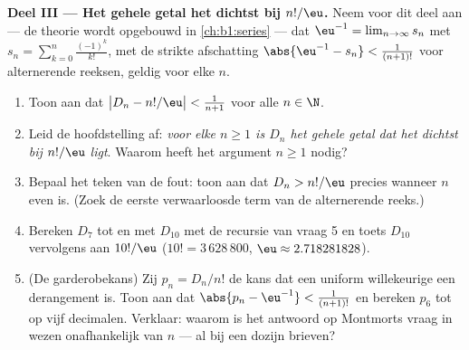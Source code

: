 \begin{problem}
\medskip
\noindent\textbf{Deel III --- Het gehele getal het dichtst bij
$n!/\eu$.} Neem voor dit deel aan --- de theorie wordt opgebouwd in
\cref{ch:b1:series} --- dat $\eu^{-1} = \lim_{n \to \infty} s_n$ met
$s_n = \sum_{k=0}^{n} \frac{(-1)^k}{k!}$, met de strikte afschatting
$\abs{\eu^{-1} - s_n} < \frac1{(n+1)!}$ voor alternerende reeksen, geldig
voor elke $n$.
\begin{enumerate}[resume]
  \item Toon aan dat $\bigl| D_n - n!/\eu \bigr| < \frac1{n+1}$ voor
        alle $n \in \N$.
  \item Leid de hoofdstelling af: \emph{voor elke $n \geq 1$ is $D_n$
        het gehele getal dat het dichtst bij $n!/\eu$ ligt}. Waarom
        heeft het argument $n \geq 1$ nodig?
  \item Bepaal het teken van de fout: toon aan dat $D_n > n!/\eu$
        precies wanneer $n$ even is. (Zoek de eerste verwaarloosde term
        van de alternerende reeks.)
  \item Bereken $D_7$ tot en met $D_{10}$ met de recursie van vraag 5
        en toets $D_{10}$ vervolgens aan $10!/\eu$ ($10! =
        3\,628\,800$, $\eu \approx 2.718281828$).
  \item (De garderobekans) Zij $p_n = D_n/n!$ de kans dat een uniform
        willekeurige  een derangement is. Toon aan dat
        $\abs{p_n - \eu^{-1}} < \frac1{(n+1)!}$ en bereken $p_6$ tot op
        vijf decimalen. Verklaar: waarom is het antwoord op Montmorts
        vraag in wezen onafhankelijk van $n$ --- al bij een dozijn
        brieven?
\end{enumerate}


\end{problem}
